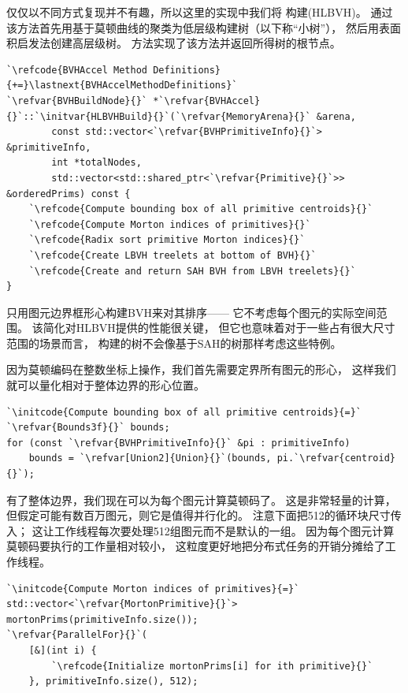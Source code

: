 仅仅以不同方式复现并不有趣，所以这里的实现中我们将
构建(HLBVH)。
通过该方法首先用基于莫顿曲线的聚类为低层级构建树（以下称“小树”），
然后用表面积启发法创建高层级树。
方法实现了该方法并返回所得树的根节点。
\begin{lstlisting}
`\refcode{BVHAccel Method Definitions}{+=}\lastnext{BVHAccelMethodDefinitions}`
`\refvar{BVHBuildNode}{}` *`\refvar{BVHAccel}{}`::`\initvar{HLBVHBuild}{}`(`\refvar{MemoryArena}{}` &arena, 
        const std::vector<`\refvar{BVHPrimitiveInfo}{}`> &primitiveInfo,
        int *totalNodes,
        std::vector<std::shared_ptr<`\refvar{Primitive}{}`>> &orderedPrims) const {
    `\refcode{Compute bounding box of all primitive centroids}{}`
    `\refcode{Compute Morton indices of primitives}{}`
    `\refcode{Radix sort primitive Morton indices}{}`
    `\refcode{Create LBVH treelets at bottom of BVH}{}`
    `\refcode{Create and return SAH BVH from LBVH treelets}{}`
}
\end{lstlisting}

只用图元边界框形心构建BVH来对其排序——
它不考虑每个图元的实际空间范围。
该简化对HLBVH提供的性能很关键，
但它也意味着对于一些占有很大尺寸范围的场景而言，
构建的树不会像基于SAH的树那样考虑这些特例。

因为莫顿编码在整数坐标上操作，我们首先需要定界所有图元的形心，
这样我们就可以量化相对于整体边界的形心位置。
\begin{lstlisting}
`\initcode{Compute bounding box of all primitive centroids}{=}`
`\refvar{Bounds3f}{}` bounds;
for (const `\refvar{BVHPrimitiveInfo}{}` &pi : primitiveInfo)
    bounds = `\refvar[Union2]{Union}{}`(bounds, pi.`\refvar{centroid}{}`);
\end{lstlisting}

有了整体边界，我们现在可以为每个图元计算莫顿码了。
这是非常轻量的计算，但假定可能有数百万图元，则它是值得并行化的。
注意下面把512的循环块尺寸传入；
这让工作线程每次要处理512组图元而不是默认的一组。
因为每个图元计算莫顿码要执行的工作量相对较小，
这粒度更好地把分布式任务的开销分摊给了工作线程。
\begin{lstlisting}
`\initcode{Compute Morton indices of primitives}{=}`
std::vector<`\refvar{MortonPrimitive}{}`> mortonPrims(primitiveInfo.size());
`\refvar{ParallelFor}{}`(
    [&](int i) {
        `\refcode{Initialize mortonPrims[i] for ith primitive}{}`
    }, primitiveInfo.size(), 512);
\end{lstlisting}

